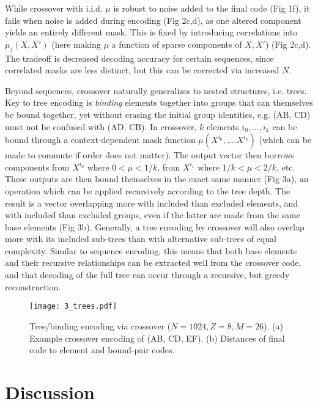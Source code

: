 \documentclass{article}
\begin{document}
While crossover with i.i.d. $\mu$ is robust to noise added to the final code (Fig 1f), it fails when noise is added during encoding (Fig 2c,d), as one altered component yields an entirely different mask. This is fixed by introducing correlations into $\mu_j(X, X')$ (here making $\mu$ a function of sparse components of $X, X'$) (Fig 2c,d). The tradeoff is decreased decoding accuracy for certain sequences, since correlated masks are less distinct, but this can be corrected via increased $N$.

Beyond sequences, crossover naturally generalizes to nested structures, i.e. trees. Key to tree encoding is \textit{binding} elements together into groups that can themselves be bound together, yet without erasing the initial group identities, e.g. (AB, CD) must not be confused with (AD, CB). In crossover, $k$ elements $i_0, ..., i_k$ can be bound through a context-dependent mask function $\mu(X^{i_0}, .... X^{i_k})$ (which can be made to commute if order does not matter). The output vector then borrows components from $X^{i_0}$ where $0 < \mu < 1/k$, from $X^{i_1}$ where $1/k < \mu < 2/k$, etc. These outputs are then bound themselves in the exact same manner (Fig 3a), an operation which can be applied recursively according to the tree depth. The result is a vector overlapping more with included than excluded elements, and with included than excluded groups, even if the latter are made from the same base elements (Fig 3b). Generally, a tree encoding by crossover will also overlap more with its included sub-trees than with alternative sub-trees of equal complexity. Similar to sequence encoding, this means that both base elements and their recursive relationships can be extracted well from the crossover code, and that decoding of the full tree can occur through a recursive, but greedy reconstruction.

\begin{figure}
\label{fig:3}
  \centering
  \texttt{[image: 3\_trees.pdf]}
  \caption{Tree/binding encoding via crossover ($N=1024, Z=8, M=26$). (a) Example crossover encoding of (AB, CD, EF). (b) Distances of final code to element and bound-pair codes.}
\end{figure}
\section{Discussion}
\end{document}
